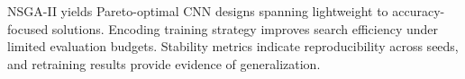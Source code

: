 NSGA-II yields Pareto-optimal CNN designs spanning lightweight to accuracy-focused solutions.
Encoding training strategy improves search efficiency under limited evaluation budgets.
Stability metrics indicate reproducibility across seeds, and retraining results provide evidence of generalization.
